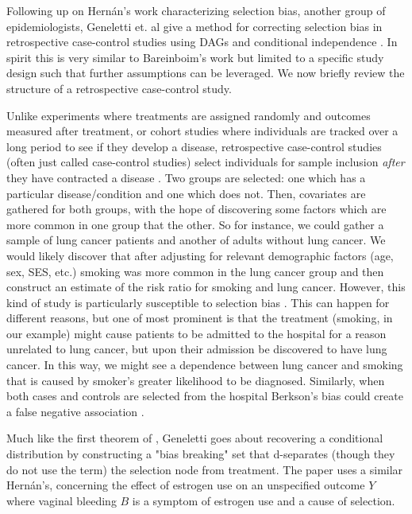 \documentclass[12pt,twoside]{reedthesis}
\theoremstyle{definition}
\begin{document}
Following up on Hern\'an's work characterizing selection bias, another  group of epidemiologists,  Geneletti et. al give a method for correcting selection bias in retrospective case-control studies using DAGs and conditional independence \citep{Geneletti_2008}. In spirit this is very similar to Bareinboim's work but limited to a specific study design such that further assumptions can be leveraged.  We now briefly review the structure of a retrospective case-control study. 

Unlike experiments where treatments are assigned randomly and outcomes measured after treatment, or cohort studies where individuals are tracked over a long period to see if they develop a disease, retrospective case-control studies (often just called case-control studies) select individuals for sample inclusion \emph{after} they have contracted a disease \citep{Woodward_1999}. Two groups are selected: one which has a particular disease/condition and one which does not. Then, covariates are gathered for both groups, with the hope of discovering some factors which are more common in one group that the other. So for instance, we could gather a sample of lung cancer patients and another of adults without lung cancer. We would likely discover that after adjusting for relevant demographic factors (age, sex, SES, etc.) smoking was more common in the lung cancer group and then construct an estimate of the risk ratio for smoking and lung cancer. However, this kind of study is particularly susceptible to selection bias \citep{Woodward_1999} \citep{Geneletti_2008}. This can happen for different reasons, but one of most prominent is that the treatment (smoking, in our example) might cause patients to be admitted to the hospital for a reason unrelated to lung cancer, but upon their admission be discovered to have lung cancer. In this way, we might see a dependence between lung cancer and smoking that is caused by smoker's greater likelihood to be diagnosed.  Similarly, when both cases and controls are selected from the hospital Berkson's bias could create a false negative association \citep{Hernan_2004}.  

Much like the first theorem of \cite{Bareinboim_2014}, Geneletti goes about recovering a conditional distribution by constructing a "bias breaking" set that d-separates (though they do not use the term) the selection node from treatment. The paper uses a similar Hern\'an's, concerning the effect of estrogen use on an unspecified outcome $Y$ where vaginal bleeding $B$ is a symptom of estrogen use and a cause of selection.
\end{document}
